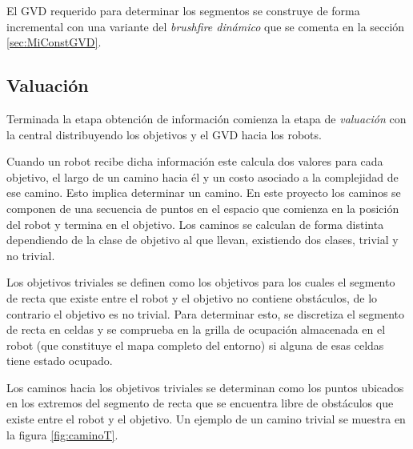 El GVD requerido para determinar los segmentos se construye de forma
incremental con una variante del \emph{brushfire dinámico} que se comenta en la
sección \ref{sec:MiConstGVD}.

\subsection{Valuación} \label{subsec:MiValSub}

Terminada la etapa obtención de información comienza la etapa de \emph{valuación} con la
central distribuyendo los objetivos y el GVD hacia los robots. 

Cuando un robot recibe dicha información este calcula dos valores para cada
objetivo, el largo de un camino hacia él y un costo asociado a la complejidad
de ese camino. Esto implica determinar un camino. En este proyecto los caminos
se componen de una secuencia de puntos en el espacio que comienza en la
posición del robot y termina en el objetivo. Los caminos se calculan de forma
distinta dependiendo de la clase de objetivo al que llevan, existiendo dos
clases, trivial y no trivial.

Los objetivos triviales se definen como los objetivos para los cuales el
segmento de recta que existe entre el robot y el objetivo no contiene
obstáculos, de lo contrario el objetivo es no trivial. Para determinar esto, se
discretiza el segmento de recta en celdas \cite{foleyphillips} y se comprueba
en la grilla de ocupación almacenada en el robot (que constituye el mapa
completo del entorno) si alguna de esas celdas tiene estado ocupado. 

Los caminos hacia los objetivos triviales se determinan como los puntos
ubicados en los extremos del segmento de recta que se encuentra libre de
obstáculos que existe entre el robot y el objetivo. Un ejemplo de un camino
trivial se muestra en la figura \ref{fig:caminoT}.


